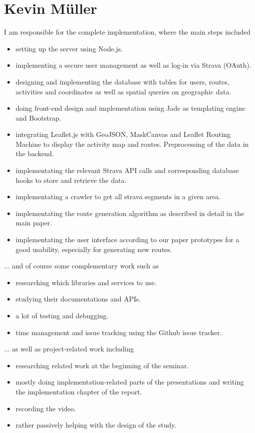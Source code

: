 \documentclass{sigchi}
\begin{document}
\section{Kevin M\"uller}
I am responsible for the complete implementation, where the main steps included
\begin{itemize}
\item setting up the server using Node.js.
\item implementing a secure user management as well as log-in via Strava (OAuth).
\item designing and implementing the database with tables for users, routes, activities and coordinates as well as spatial queries on geographic data.
\item doing front-end design and implementation using Jade as templating engine and Bootstrap.
\item integrating Leaflet.js with GeoJSON, MaskCanvas and Leaflet Routing Machine to display the activity map and routes. Preprocessing of the data in the backend.
\item implementating the relevant Strava API calls and corresponding database hooks to store and retrieve the data.
\item implementating a crawler to get all strava segments in a given area.
\item implementating the route generation algorithm as described in detail in the main paper.
\item implementating the user interface according to our paper prototypes for a good usability, especially for generating new routes.
\end{itemize}
... and of course some complementary work such as
\begin{itemize}
\item researching which libraries and services to use.
\item studying their documentations and APIs.
\item a lot of testing and debugging.
\item time management and issue tracking using the Github issue tracker.
\end{itemize}
... as well as project-related work including
\begin{itemize}
\item researching related work at the beginning of the seminar.
\item mostly doing implementation-related parts of the presentations and writing the implementation chapter of the report.
\item recording the video.
\item rather passively helping with the design of the study.
\end{itemize}
\end{document}
